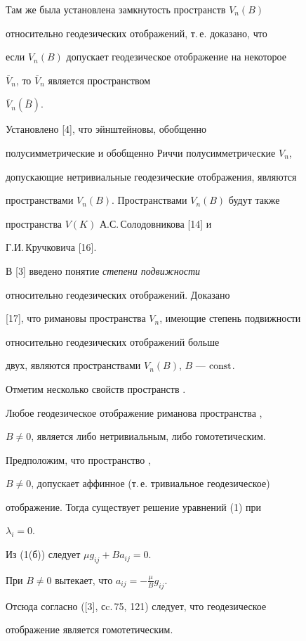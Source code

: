 Там же была установлена замкнутость пространств $V_n(B)$


относительно геодезических отображений, т.\,е. доказано, что


если $V_n(B)$ допускает геодезическое отображение на некоторое 


$\overline{V}_n$, то $\overline{V}_n$ является пространством 


$\overline{V}_n(\overline B)$.





Установлено [4], что эйнштейновы, обобщенно


полусимметрические и обобщенно Риччи полусимметрические $V_n$,


допускающие нетривиальные геодезические отображения, являются


пространствами $V_n(B)$. Пространствами $V_n(B)$ будут также


пространства $V(K)$ А.С.\,Солодовникова [14] и


Г.И.\,Кручковича [16].





В [3] введено понятие {\it степени подвижности}


относительно геодезических отображений. Доказано


[17], что римановы пространства $V_n$, имеющие степень подвижности


относительно геодезических отображений больше


двух, являются пространствами $V_n(B)$,  $B$ --- $\operatorname{const}$.





Отметим несколько свойств пространств \vnb.





\begin{thm}


Любое геодезическое отображение риманова пространства \vnb, 


$B\neq 0$, является либо нетривиальным, либо гомотетическим.


\end{thm}





\begin{pf}


Предположим, что пространство \vnb,


$B\neq0$, допускает аффинное (т.\,е. тривиальное геодезическое) 


отображение. Тогда существует решение уравнений (1) при 


$\lambda_i=0$.


Из (1(б)) следует $\mu g_{ij}+Ba_{ij}=0$.


При $B\neq 0$ вытекает, что $a_{ij}=-\frac{\mu}{B} g_{ij}$. 


Отсюда согласно ([3], сc.\,75, 121) следует, что геодезическое


отображение является гомотетическим. 


\end{pf}





